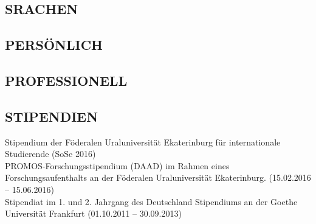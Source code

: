 \documentclass[10pt, a4paper]{article}
\begin{document}
\makeprofile %

\begincols






\subsection{SRACHEN}
\langcircles %

\subsection{PERSÖNLICH}
\perskills %

\subsection{PROFESSIONELL}
\proskills %

\subsection{STIPENDIEN}

Stipendium der Föderalen Uraluniversität Ekaterinburg für internationale Studierende (SoSe 2016)\\

PROMOS-Forschungsstipendium (DAAD) im Rahmen eines Forschungsaufenthalts an der Föderalen Uraluniversität Ekaterinburg. (15.02.2016 – 15.06.2016) \\

Stipendiat im 1. und 2. Jahrgang des Deutschland Stipendiums an der Goethe Universität Frankfurt (01.10.2011 – 30.09.2013)
\end{document}

